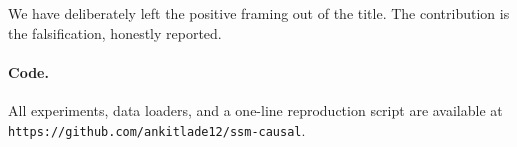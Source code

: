 \documentclass{article}
\begin{document}
We have deliberately left the positive framing out of the title.
The contribution is the falsification, honestly reported.

\paragraph{Code.} All experiments, data loaders, and a one-line
reproduction script are available at
\texttt{https://github.com/ankitlade12/ssm-causal}.


\end{document}

